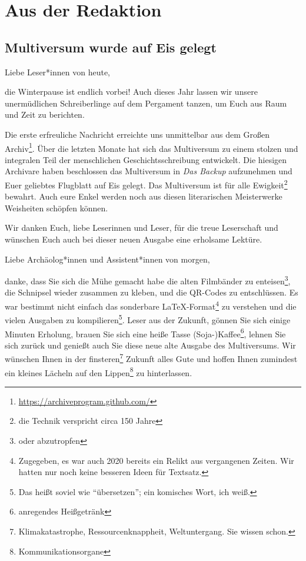 \documentclass[final]{multiversum}
\begin{document}
\makemultititle
%

\section{Aus der Redaktion}
\subsection{Multiversum wurde auf Eis gelegt}
Liebe Leser*innen von heute, 

die Winterpause ist endlich vorbei! Auch dieses Jahr lassen wir unsere unermüdlichen Schreiberlinge auf dem Pergament tanzen, um Euch aus Raum und Zeit zu berichten. 

Die erste erfreuliche Nachricht erreichte uns unmittelbar aus dem Großen Archiv\footnote{\url{https://archiveprogram.github.com/}}. Über die letzten Monate hat sich das Multiversum zu einem stolzen und integralen Teil der menschlichen Geschichtsschreibung entwickelt. Die hiesigen Archivare haben beschlossen das Multiversum in \textit{Das Backup} aufzunehmen und Euer geliebtes Flugblatt auf Eis gelegt. 
Das Multiversum ist für alle Ewigkeit\footnote{die Technik verspricht circa 150 Jahre} bewahrt. Auch eure Enkel werden noch aus diesen literarischen Meisterwerke Weisheiten schöpfen können.

Wir danken Euch, liebe Leserinnen und Leser, für die treue Leserschaft und wünschen Euch auch bei dieser neuen Ausgabe eine erholsame Lektüre.

\vspace{1em}\noindent
Liebe Archäolog*innen und Assistent*innen von morgen,

danke, dass Sie sich die Mühe gemacht habe die alten Filmbänder zu enteisen\footnote{oder abzutropfen}, die Schnipsel wieder zusammen zu kleben, und die QR-Codes zu entschlüssen.
Es war bestimmt nicht einfach das sonderbare LaTeX-Format\footnote{Zugegeben, es war auch 2020 bereits ein Relikt aus vergangenen Zeiten. Wir hatten nur noch keine besseren Ideen für Textsatz.} zu verstehen und die vielen Ausgaben zu kompilieren\footnote{ Das heißt soviel wie \enquote{übersetzen}; ein komisches Wort, ich weiß.}.
Leser aus der Zukunft, gönnen Sie sich einige Minuten Erholung, brauen Sie sich eine heiße Tasse (Soja-)Kaffee\footnote{anregendes Heißgetränk}, lehnen Sie sich zurück und genießt auch Sie diese neue alte Ausgabe des Multiversums.
Wir wünschen Ihnen in der finsteren\footnote{ Klimakatastrophe, Ressourcenknappheit, Weltuntergang. Sie wissen schon.} Zukunft alles Gute und hoffen Ihnen zumindest ein kleines Lächeln auf den Lippen\footnote{Kommunikationsorgane} zu hinterlassen. 
\end{document}
